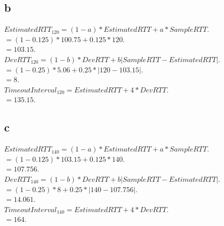 \documentclass{article}
\begin{document}
\subsection*{b}  $EstimatedRTT_{120} = (1-a)*EstimatedRTT + a * SampleRTT$.\\
\newline $= (1-0.125) * 100.75 + 0.125*120$.\\
\newline $= 103.15$.\\
\newline $DevRTT_{120} = (1-b) * DevRTT + b | SampleRTT -EstimatedRTT|$.\\
\newline $= (1-0.25) * 5.06 + 0.25 * |120-103.15|$.\\
\newline $= 8$.\\
\newline $TimeoutInterval_{120} = EstimatedRTT + 4 * DevRTT$.\\
\newline $= 135.15$.\\

\subsection*{c}  $EstimatedRTT_{140} = (1-a)*EstimatedRTT + a * SampleRTT$.\\
\newline $= (1-0.125) * 103.15 + 0.125*140$.\\
\newline $= 107.756$.\\
\newline $DevRTT_{140} = (1-b) * DevRTT + b | SampleRTT -EstimatedRTT|$.\\
\newline $= (1-0.25) * 8 + 0.25 * |140-107.756|$.\\
\newline $= 14.061$.\\
\newline $TimeoutInterval_{140} = EstimatedRTT + 4 * DevRTT$.\\
\newline $= 164$.\\
\end{document}
